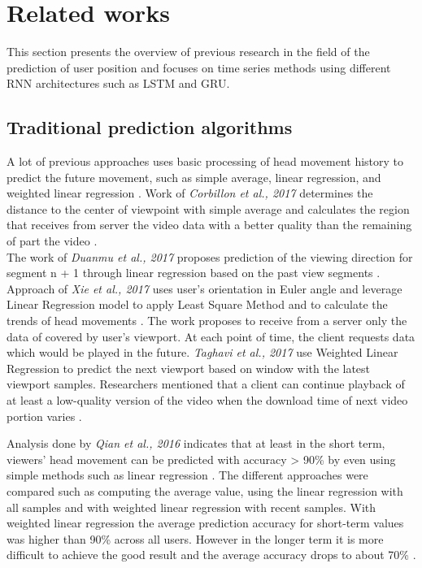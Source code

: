 \newpage
\section{Related works}
\label{sec:related}
This section presents the overview of previous research in the field of the prediction of user position and focuses on time series methods using different RNN architectures such as LSTM and GRU.  


\subsection{Traditional prediction algorithms}
\label{sec:related:timeseries}
A lot of previous approaches uses basic processing of head movement history to predict the future movement, such as simple average, linear regression, and weighted linear regression \cite{attention_saliency}. Work of \textit{Corbillon et al., 2017} determines the distance to the center of viewpoint with simple average and calculates the region that receives from server the video data with a better quality than the remaining of part the video \cite{simple_average}.\\ The work of \textit{Duanmu et al., 2017} proposes prediction of the viewing direction for segment n + 1 through linear regression based on the past view segments \cite{linreg1}. Approach of \textit{Xie et al., 2017} uses user’s orientation in Euler angle and leverage Linear Regression model to apply Least Square Method and to calculate the trends of head movements \cite{linreg2}. The work \cite{linreg3} proposes to receive from a server only the data of covered by user's viewport. At each point of time, the client requests data which would be played in the future. \textit{Taghavi et al., 2017} use Weighted Linear Regression to predict the next viewport based on window with the latest viewport samples. Researchers mentioned that a client can continue playback of at least a low-quality version of the video when the download time of next video portion varies \cite{linreg3}.

Analysis done by \textit{Qian et al., 2016} indicates that at least in the short term, viewers’ head movement can be predicted with accuracy > 90\% by even using simple methods such as linear regression \cite{cellular_opt}. The different approaches were compared such as computing the average value, using the linear regression with all samples and with weighted linear regression with recent samples. With weighted linear regression the average prediction accuracy for short-term values was higher than 90\% across all users. However in the longer term it is more difficult to achieve the good result and the average accuracy drops to about 70\% \cite{cellular_opt}.

